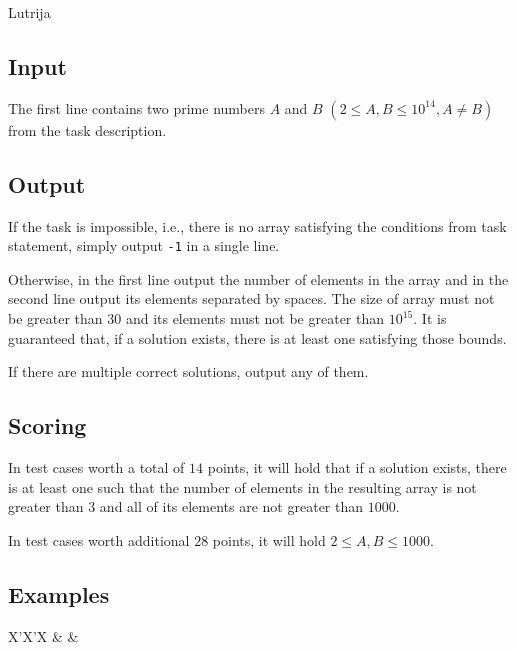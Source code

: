 \begin{statement}[
  problempoints=70,
  timelimit=2 seconds,
  memorylimit=512 MiB,
]{Lutrija}
\subsection*{Input}
The first line contains two prime numbers $A$ and $B$
$(2 \le A, B \le 10^{14}, A \ne B)$ from the task description.

\subsection*{Output}
If the task is impossible, i.e., there is no array satisfying the conditions
from task statement, simply output \texttt{-1} in a single line.

Otherwise, in the first line output the number of elements in the array and in
the second line output its elements separated by spaces. The size of array must
not be greater than $30$ and its elements must not be greater than $10^{15}$.
It is guaranteed that, if a solution exists, there is at least one satisfying
those bounds.

If there are multiple correct solutions, output any of them.

\subsection*{Scoring}
In test cases worth a total of $14$ points, it will hold that if a solution
exists, there is at least one such that the number of elements in the resulting
array is not greater than $3$ and all of its elements are not greater than $1000$.

In test cases worth additional $28$ points, it will hold $2 \le A, B \le 1000$.

\subsection*{Examples}
\begin{tabularx}{\textwidth}{X'X'X}
 &
 &
\end{tabularx}

\end{statement}

